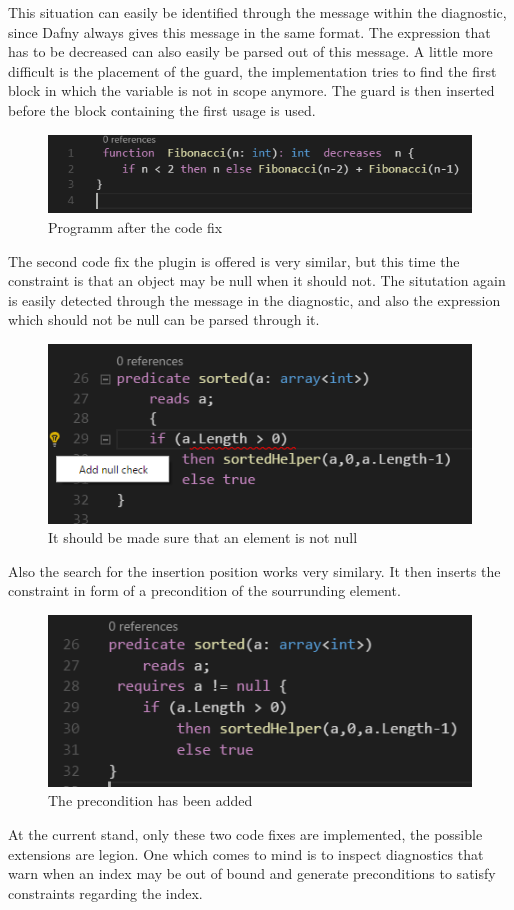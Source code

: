 This situation can easily be identified through the message within the diagnostic, since Dafny always gives this message in the same format. The expression that has to be decreased can also easily be parsed out of this message. A little more difficult is the placement of the guard, the implementation tries to find the first block in which the variable is not in scope anymore. The guard is then inserted before the block containing the first usage is used. \newline
  \begin{figure}[H]
	\centering
	\includegraphics[width=1\textwidth]{img/decreaseGuardApplied}
	\caption{Programm after the code fix}
	\label{fig:decreaseguardapplied}
\end{figure}
The second code fix the plugin is offered is very similar, but this time the constraint is that an object may be null when it should not. The situtation again is easily detected through the message in the diagnostic, and also the expression which should not be null can be parsed through it.
  \begin{figure}[H]
	\centering
	\includegraphics[width=1\textwidth]{img/nullCheck}
	\caption{It should be made sure that an element is not null}
	\label{fig:nullcheck}
\end{figure}
Also the search for the insertion position works very similary. It then inserts the constraint in form of a precondition of the sourrunding element. \newline
  \begin{figure}[H]
	\centering
	\includegraphics[width=1\textwidth]{img/nullCheckApplied}
	\caption{The precondition has been added}
	\label{fig:nullcheckapplied}
\end{figure}
At the current stand, only these two code fixes are implemented, the possible extensions are legion. One which comes to mind is to inspect diagnostics that warn when an index may be out of bound and generate preconditions to satisfy constraints regarding the index. \newline
